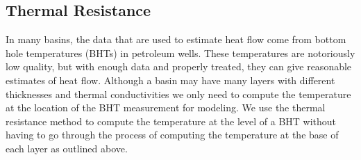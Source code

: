\subsection{Thermal Resistance}\label{sec:thermresist}
In many basins, the data that are used to estimate heat flow come from bottom hole temperatures (BHTs) in petroleum wells.  These temperatures are notoriously low quality, but with enough data and properly treated, they can give reasonable estimates of heat flow.  Although a basin may have many layers with different thicknesses and thermal conductivities we only need to compute the temperature at the location of the BHT measurement for modeling.  We use the thermal resistance method to compute the temperature at the level of a BHT without having to go through the process of computing the temperature at the base of each layer as outlined above.

